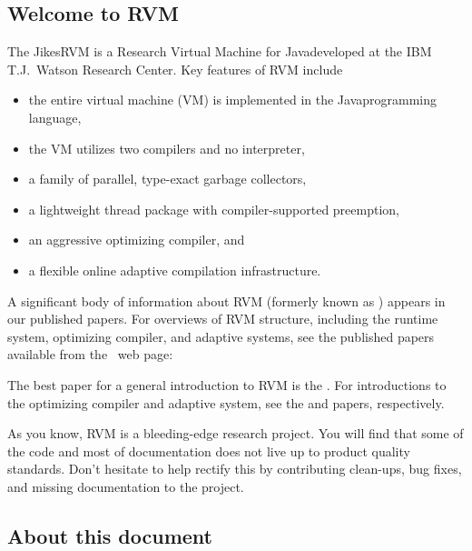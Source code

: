 \subsection {Welcome to RVM}

The Jikes\trademark RVM is a Research Virtual Machine for
Java\trademark developed at the IBM T.J.\ Watson Research Center.  Key
features of RVM include
\begin{itemize}
\item the entire virtual machine (VM) is implemented in the
  Java\trademark  programming language,
\item the VM utilizes two compilers and no interpreter,
\item a family of parallel, type-exact garbage collectors,
\item a lightweight thread package with compiler-supported preemption,
\item an aggressive optimizing compiler, and 
\item a flexible online adaptive compilation infrastructure.
\end{itemize}

A significant body of information about RVM (formerly known as \jp) appears 
in our published
papers.  For overviews of RVM structure, including the runtime system,
optimizing compiler, and adaptive systems, see the published papers
available from the \jp\ web page:
\begin{quote}
\xlink{{\RVMPubsURL}}{\RVMPubsURL}
\end{quote}

The best paper for a general introduction to RVM is 
the 
.  
For introductions to the
optimizing compiler and adaptive system, see the 
{\JavaGrandePaperURL}
 and 
{\OOPSLAPaperURL}  
papers, respectively.

As you know, RVM is a bleeding-edge research project.  You will find that
some of the code and most of documentation does not live up to product  
quality standards. Don't hesitate to help rectify this by
contributing clean-ups, bug fixes, and missing documentation to 
the project.  
\subsection {About this document}

